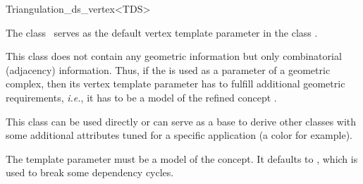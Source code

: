 \begin{ccRefClass}{Triangulation_ds_vertex<TDS>}

\ccDefinition

The class \ccRefName\ serves as the default vertex template parameter in the
class .

This class does not contain any geometric information but only combinatorial
(adjacency) information. Thus, if the  is
used as a parameter of a geometric complex, then its vertex template parameter
has to fulfill additional geometric requirements, \emph{i.e.}, it has to be a
model of the refined concept .

This class can be used directly or can serve as a base to derive other classes
with some additional attributes tuned for a specific application (a color for
example).


\ccParameters

The template parameter  must be a model of the
 concept. It defaults to , which is
used to break some dependency cycles.

\ccIsModel


\ccSeeAlso


\end{ccRefClass}
